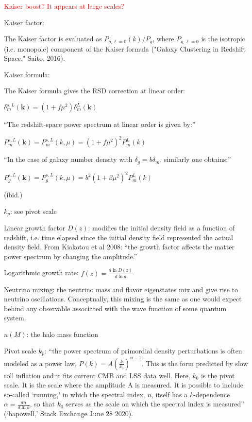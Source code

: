 \documentclass[11pt]{article}
\begin{document}
\textcolor{red}{Kaiser boost? It appears at large scales?}

Kaiser factor:

The Kaiser factor is evaluated as $P_{g, \ell=0} (k) / P_g$, where
$P_{g, \ell=0}$ is the isotropic (i.e. monopole) component of the Kaiser
formula ("Galaxy Clustering in Redshift Space," Saito, 2016).

Kaiser formula:

The Kaiser formula gives the RSD correction at linear order:

$\delta_m^{s, L} (\bm{k}) = (1 + f \mu^2) \delta_m^L (\bm{k})$

``The redshift-space power spectrum at linear order is given by:''

$P_m^{s, L} (\bm{k}) = P_m^{s, L} (k, \mu) = (1 + f \mu^2)^2 P_m^L (k)$

``In the case of galaxy number density with $\delta_g = b \delta_m$, similarly
one obtains:''

$
P_g^{s, L} (\bm{k})
=
P_g^{s, L} (k, \mu)
=
b^2 (1 + \beta \mu^2)^2 P_m^L (k)
$

(ibid.)

$k_p$: see pivot scale

    Linear growth factor $D(z)$: modifies the initial density field as a
function
of redshift, i.e. time elapsed since the initial density field represented
the actual density field. From Kiakotou et al 2008: ``the growth factor
affects the matter power spectrum by changing the amplitude.''

Logarithmic growth rate: $f(z) = \frac{d \ln D(z)}{d \ln a}$

Neutrino mixing: the neutrino mass and flavor eigenstates mix and give rise
to neutrino oscillations. Conceptually, this mixing is the same as  one would
expect behind any observable associated with the wave function of some quantum
system.

$n(M)$: the halo mass function

Pivot scale $k_p$: ``the power spectrum of primordial density perturbations is
often modeled as a power law, $P(k) = A \left( \frac{k}{k_0} \right)^{n - 1}$.
This is the form predicted by slow roll inflation and it fits current CMB and
LSS data well. Here, $k_0$ is the pivot scale. It is the scale where the
amplitude A is measured. It is possible to include so-called `running,' in
which the spectral index, $n$, itself has a $k$-dependence
$\alpha = \frac{dn}{d \ln k}$, so that $k_0$ serves as the scale on which the
spectral index is measured'' (`bapowell,' Stack Exchange June 28 2020).
\end{document}
